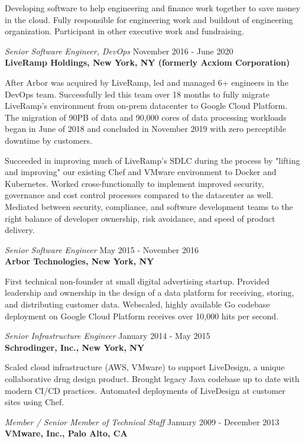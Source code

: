 \documentclass[overlapped,line,margin]{res}
\begin{document}
\begin{resume}
  Developing software to help engineering and finance work together to
  save money in the cloud. Fully responsible for engineering work and
  buildout of engineering organization. Participant in other executive
  work and fundraising.

\textit{Senior Software Engineer, DevOps} \hfill November 2016 - June 2020 \\
\textbf{LiveRamp Holdings, New York, NY (formerly Acxiom Corporation)}

  After Arbor was acquired by LiveRamp, led and managed 6+ engineers in
  the DevOps team. Successfully led this team over 18 months to fully
  migrate LiveRamp's environment from on-prem datacenter to Google Cloud
  Platform. The migration of 90PB of data and 90,000 cores of data
  processing workloads began in June of 2018 and concluded in November
  2019 with zero perceptible downtime by customers.

  Succeeded in improving much of LiveRamp's SDLC during the process by
  "lifting and improving" our existing Chef and VMware environment to
  Docker and Kubernetes. Worked cross-functionally to implement improved
  security, governance and cost control processes compared to the
  datacenter as well. Mediated between security, compliance, and
  software development teams to the right balance of developer
  ownership, risk avoidance, and speed of product delivery.

\textit{Senior Software Engineer} \hfill May 2015 - November 2016 \\
\textbf{Arbor Technologies, New York, NY}

  First technical non-founder at small digital advertising startup.
  Provided leadership and ownership in the design of a data platform for
  receiving, storing, and distributing customer data. Webscaled, highly
  available Go codebase deployment on Google Cloud Platform receives
  over 10,000 hits per second.

\textit{Senior Infrastructure Engineer} \hfill January 2014 - May 2015 \\
\textbf{Schrodinger, Inc., New York, NY}

  Scaled cloud infrastructure (AWS, VMware) to support LiveDesign, a
  unique collaborative drug design product. Brought legacy Java codebase
  up to date with modern CI/CD practices. Automated deployments of
  LiveDesign at customer sites using Chef.

\textit{Member / Senior Member of Technical Staff} \hfill January 2009 - December 2013 \\
\textbf{VMware, Inc., Palo Alto, CA}


\end{resume}
\end{document}
